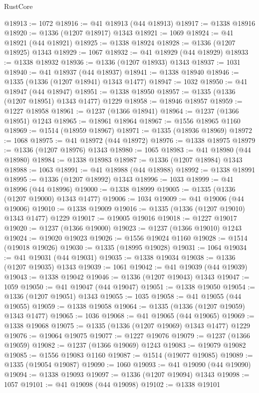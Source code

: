\begin{lexlean}{RustCore}
\begin{coremodule}
@18913 := 1072
@18916 := @41 @18913 (@44 @18913)
@18917 := @1338 @18916
@18920 := @1336 (@1207 @18917) @1343
@18921 := 1069
@18924 := @41 @18921 (@44 @18921)
@18925 := @1338 @18924
@18928 := @1336 (@1207 @18925) @1343
@18929 := 1067
@18932 := @41 @18929 (@44 @18929)
@18933 := @1338 @18932
@18936 := @1336 (@1207 @18933) @1343
@18937 := 1031
@18940 := @41 @18937 (@44 @18937)
@18941 := @1338 @18940
@18946 := @1335 (@1336 (@1207 @18941) @1343 @1477)
@18947 := 1032
@18950 := @41 @18947 (@44 @18947)
@18951 := @1338 @18950
@18957 := @1335 (@1336 (@1207 @18951) @1343 @1477) @1229
@18958 := @18946 @18957
@18959 := @1227 @18958
@18961 := @1237 (@1366 @18941)
@18964 := @1237 (@1366 @18951) @1243
@18965 := @18961 @18964
@18967 := @1556 @18965 @1160
@18969 := @1514 (@18959 @18967)
@18971 := @1335 (@18936 @18969)
@18972 := 1068
@18975 := @41 @18972 (@44 @18972)
@18976 := @1338 @18975
@18979 := @1336 (@1207 @18976) @1343
@18980 := 1065
@18983 := @41 @18980 (@44 @18980)
@18984 := @1338 @18983
@18987 := @1336 (@1207 @18984) @1343
@18988 := 1063
@18991 := @41 @18988 (@44 @18988)
@18992 := @1338 @18991
@18995 := @1336 (@1207 @18992) @1343
@18996 := 1033
@18999 := @41 @18996 (@44 @18996)
@19000 := @1338 @18999
@19005 := @1335 (@1336 (@1207 @19000) @1343 @1477)
@19006 := 1034
@19009 := @41 @19006 (@44 @19006)
@19010 := @1338 @19009
@19016 := @1335 (@1336 (@1207 @19010) @1343 @1477) @1229
@19017 := @19005 @19016
@19018 := @1227 @19017
@19020 := @1237 (@1366 @19000)
@19023 := @1237 (@1366 @19010) @1243
@19024 := @19020 @19023
@19026 := @1556 @19024 @1160
@19028 := @1514 (@19018 @19026)
@19030 := @1335 (@18995 @19028)
@19031 := 1064
@19034 := @41 @19031 (@44 @19031)
@19035 := @1338 @19034
@19038 := @1336 (@1207 @19035) @1343
@19039 := 1061
@19042 := @41 @19039 (@44 @19039)
@19043 := @1338 @19042
@19046 := @1336 (@1207 @19043) @1343
@19047 := 1059
@19050 := @41 @19047 (@44 @19047)
@19051 := @1338 @19050
@19054 := @1336 (@1207 @19051) @1343
@19055 := 1035
@19058 := @41 @19055 (@44 @19055)
@19059 := @1338 @19058
@19064 := @1335 (@1336 (@1207 @19059) @1343 @1477)
@19065 := 1036
@19068 := @41 @19065 (@44 @19065)
@19069 := @1338 @19068
@19075 := @1335 (@1336 (@1207 @19069) @1343 @1477) @1229
@19076 := @19064 @19075
@19077 := @1227 @19076
@19079 := @1237 (@1366 @19059)
@19082 := @1237 (@1366 @19069) @1243
@19083 := @19079 @19082
@19085 := @1556 @19083 @1160
@19087 := @1514 (@19077 @19085)
@19089 := @1335 (@19054 @19087)
@19090 := 1060
@19093 := @41 @19090 (@44 @19090)
@19094 := @1338 @19093
@19097 := @1336 (@1207 @19094) @1343
@19098 := 1057
@19101 := @41 @19098 (@44 @19098)
@19102 := @1338 @19101

\end{coremodule}
\end{lexlean}
